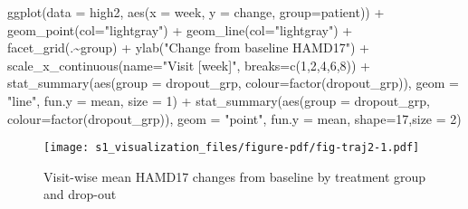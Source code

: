 \documentclass[
  letterpaper,
  DIV=11,
  numbers=noendperiod]{scrreprt}
\newenvironment{Shaded}{\begin{snugshade}}{\end{snugshade}}
\newcommand{\AttributeTok}[1]{\textcolor[rgb]{0.40,0.45,0.13}{#1}}
\newcommand{\DecValTok}[1]{\textcolor[rgb]{0.68,0.00,0.00}{#1}}
\newcommand{\FunctionTok}[1]{\textcolor[rgb]{0.28,0.35,0.67}{#1}}
\newcommand{\NormalTok}[1]{\textcolor[rgb]{0.00,0.23,0.31}{#1}}
\newcommand{\SpecialCharTok}[1]{\textcolor[rgb]{0.37,0.37,0.37}{#1}}
\newcommand{\StringTok}[1]{\textcolor[rgb]{0.13,0.47,0.30}{#1}}
\begin{document}
\begin{Shaded}
\begin{Highlighting}[]
\FunctionTok{ggplot}\NormalTok{(}\AttributeTok{data =}\NormalTok{ high2, }\FunctionTok{aes}\NormalTok{(}\AttributeTok{x =}\NormalTok{ week, }\AttributeTok{y =}\NormalTok{ change, }\AttributeTok{group=}\NormalTok{patient)) }\SpecialCharTok{+} 
  \FunctionTok{geom\_point}\NormalTok{(}\AttributeTok{col=}\StringTok{"lightgray"}\NormalTok{) }\SpecialCharTok{+} \FunctionTok{geom\_line}\NormalTok{(}\AttributeTok{col=}\StringTok{"lightgray"}\NormalTok{) }\SpecialCharTok{+} \FunctionTok{facet\_grid}\NormalTok{(.}\SpecialCharTok{\textasciitilde{}}\NormalTok{group) }\SpecialCharTok{+}
  \FunctionTok{ylab}\NormalTok{(}\StringTok{"Change from baseline HAMD17"}\NormalTok{) }\SpecialCharTok{+} \FunctionTok{scale\_x\_continuous}\NormalTok{(}\AttributeTok{name=}\StringTok{"Visit [week]"}\NormalTok{, }\AttributeTok{breaks=}\FunctionTok{c}\NormalTok{(}\DecValTok{1}\NormalTok{,}\DecValTok{2}\NormalTok{,}\DecValTok{4}\NormalTok{,}\DecValTok{6}\NormalTok{,}\DecValTok{8}\NormalTok{)) }\SpecialCharTok{+}
  \FunctionTok{stat\_summary}\NormalTok{(}\FunctionTok{aes}\NormalTok{(}\AttributeTok{group =}\NormalTok{ dropout\_grp, }\AttributeTok{colour=}\FunctionTok{factor}\NormalTok{(dropout\_grp)), }\AttributeTok{geom =} \StringTok{"line"}\NormalTok{, }\AttributeTok{fun.y =}\NormalTok{ mean,}
               \AttributeTok{size =} \DecValTok{1}\NormalTok{) }\SpecialCharTok{+}
  \FunctionTok{stat\_summary}\NormalTok{(}\FunctionTok{aes}\NormalTok{(}\AttributeTok{group =}\NormalTok{ dropout\_grp, }\AttributeTok{colour=}\FunctionTok{factor}\NormalTok{(dropout\_grp)), }\AttributeTok{geom =} \StringTok{"point"}\NormalTok{, }\AttributeTok{fun.y =}\NormalTok{ mean,}
               \AttributeTok{shape=}\DecValTok{17}\NormalTok{,}\AttributeTok{size =} \DecValTok{2}\NormalTok{)}
\end{Highlighting}
\end{Shaded}

\begin{figure}[H]

{\centering \texttt{[image: s1\_visualization\_files/figure-pdf/fig-traj2-1.pdf]}

}

\caption{\label{fig-traj2}Visit-wise mean HAMD17 changes from baseline
by treatment group and drop-out}

\end{figure}

\end{document}
